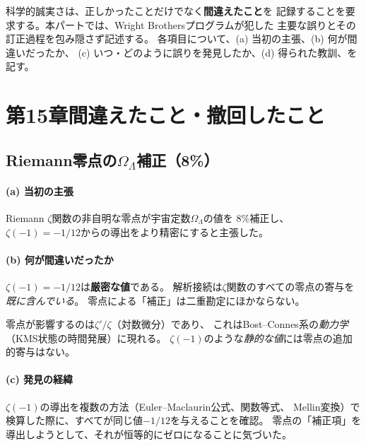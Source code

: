 \documentclass[11pt,a4paper]{article}
\begin{document}
\vspace{1em}
\noindent
科学的誠実さは、正しかったことだけでなく\textbf{間違えたこと}を
記録することを要求する。本パートでは、Wright Brothersプログラムが犯した
主要な誤りとその訂正過程を包み隠さず記述する。
各項目について、(a) 当初の主張、(b) 何が間違いだったか、
(c) いつ・どのように誤りを発見したか、(d) 得られた教訓、を記す。



\section{第15章\quad 間違えたこと・撤回したこと}
\label{ch:failures}

\subsection{Riemann零点の$\Omega_\Lambda$補正（8\%）}
\label{sec:15.1}

\paragraph{(a) 当初の主張}
Riemann $\zeta$関数の非自明な零点が宇宙定数$\Omega_\Lambda$の値を
8\%補正し、$\zeta(-1) = -1/12$からの導出をより精密にすると主張した。

\paragraph{(b) 何が間違いだったか}
$\zeta(-1) = -1/12$は\textbf{厳密な値}である。
解析接続は$\zeta$関数のすべての零点の寄与を\emph{既に含んでいる}。
零点による「補正」は二重勘定にほかならない。

零点が影響するのは$\zeta'/\zeta$（対数微分）であり、
これはBost--Connes系の\emph{動力学}（KMS状態の時間発展）に現れる。
$\zeta(-1)$のような\emph{静的な値}には零点の追加的寄与はない。

\paragraph{(c) 発見の経緯}
$\zeta(-1)$の導出を複数の方法（Euler--Maclaurin公式、関数等式、
Mellin変換）で検算した際に、すべてが同じ値$-1/12$を与えることを確認。
零点の「補正項」を導出しようとして、それが恒等的にゼロになることに気づいた。
\end{document}
